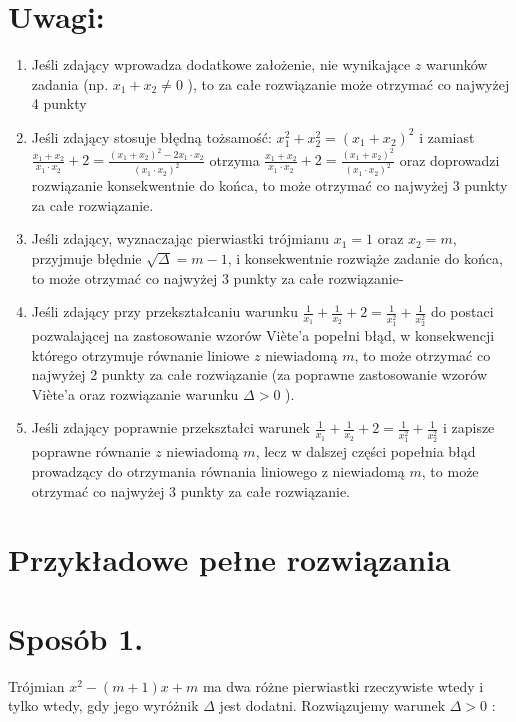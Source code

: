 \documentclass[10pt]{article}
\begin{document}
\section*{Uwagi:}
\begin{enumerate}
  \item Jeśli zdający wprowadza dodatkowe założenie, nie wynikające $z$ warunków zadania (np. $x_{1}+x_{2} \neq 0$ ), to za całe rozwiązanie może otrzymać co najwyżej 4 punkty
  \item Jeśli zdający stosuje błędną tożsamość: $x_{1}^{2}+x_{2}^{2}=\left(x_{1}+x_{2}\right)^{2}$ i zamiast $\frac{x_{1}+x_{2}}{x_{1} \cdot x_{2}}+2=\frac{\left(x_{1}+x_{2}\right)^{2}-2 x_{1} \cdot x_{2}}{\left(x_{1} \cdot x_{2}\right)^{2}}$ otrzyma $\frac{x_{1}+x_{2}}{x_{1} \cdot x_{2}}+2=\frac{\left(x_{1}+x_{2}\right)^{2}}{\left(x_{1} \cdot x_{2}\right)^{2}}$ oraz doprowadzi rozwiązanie konsekwentnie do końca, to może otrzymać co najwyżej 3 punkty za całe rozwiązanie.
  \item Jeśli zdający, wyznaczając pierwiastki trójmianu $x_{1}=1$ oraz $x_{2}=m$, przyjmuje błędnie $\sqrt{\Delta}=m-1$, i konsekwentnie rozwiąże zadanie do końca, to może otrzymać co najwyżej 3 punkty za całe rozwiązanie-
  \item Jeśli zdający przy przekształcaniu warunku $\frac{1}{x_{1}}+\frac{1}{x_{2}}+2=\frac{1}{x_{1}^{2}}+\frac{1}{x_{2}^{2}}$ do postaci pozwalającej na zastosowanie wzorów Viète'a popełni błąd, w konsekwencji którego otrzymuje równanie liniowe $z$ niewiadomą $m$, to może otrzymać co najwyżej 2 punkty za całe rozwiązanie (za poprawne zastosowanie wzorów Viète'a oraz rozwiązanie warunku $\Delta>0$ ).
  \item Jeśli zdający poprawnie przekształci warunek $\frac{1}{x_{1}}+\frac{1}{x_{2}}+2=\frac{1}{x_{1}^{2}}+\frac{1}{x_{2}^{2}}$ i zapisze poprawne równanie $z$ niewiadomą $m$, lecz w dalszej części popełnia błąd prowadzący do otrzymania równania liniowego z niewiadomą $m$, to może otrzymać co najwyżej 3 punkty za całe rozwiązanie.
\end{enumerate}

\section*{Przykładowe pełne rozwiązania}
\section*{Sposób 1.}
Trójmian $x^{2}-(m+1) x+m$ ma dwa różne pierwiastki rzeczywiste wtedy i tylko wtedy, gdy jego wyróżnik $\Delta$ jest dodatni. Rozwiązujemy warunek $\Delta>0$ :
\end{document}
